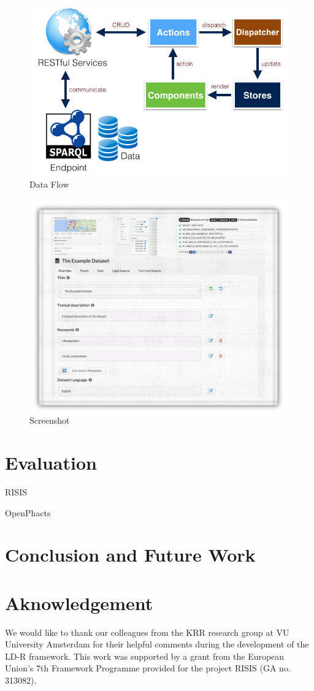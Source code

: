 \documentclass{acm_proc_article-sp}
\begin{document}
\begin{figure}[tb]
  \includegraphics[width=.9\linewidth]{images/dataflow.jpg}
  \caption{Data Flow}
\end{figure}

\begin{figure}[tb]
  \includegraphics[width=.9\linewidth]{images/screenshot.png}
  \caption{Screenshot}
\end{figure}

\section{Evaluation}

RISIS

OpenPhacts

\section{Conclusion and Future Work}

\section{Aknowledgement}
We would like to thank our colleagues from the KRR research group at VU University Amsterdam for their helpful comments during the development of the LD-R framework. This work was supported by a grant from the European Union’s 7th Framework Programme provided for the project RISIS (GA no. 313082).




\end{document}

